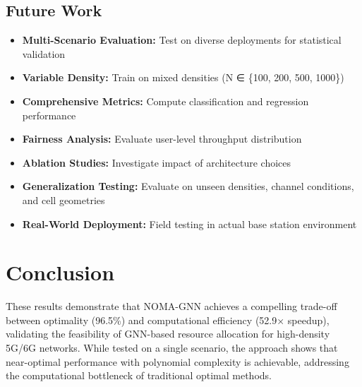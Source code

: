 \subsection{Future Work}

\begin{itemize}
    \item \textbf{Multi-Scenario Evaluation:} Test on diverse deployments for statistical validation
    
    \item \textbf{Variable Density:} Train on mixed densities (N ∈ \{100, 200, 500, 1000\})
    
    \item \textbf{Comprehensive Metrics:} Compute classification and regression performance
    
    \item \textbf{Fairness Analysis:} Evaluate user-level throughput distribution
    
    \item \textbf{Ablation Studies:} Investigate impact of architecture choices
    
    \item \textbf{Generalization Testing:} Evaluate on unseen densities, channel conditions, and cell geometries
    
    \item \textbf{Real-World Deployment:} Field testing in actual base station environment
\end{itemize}

\section{Conclusion}

These results demonstrate that NOMA-GNN achieves a compelling trade-off between optimality (96.5\%) and computational efficiency (52.9× speedup), validating the feasibility of GNN-based resource allocation for high-density 5G/6G networks. While tested on a single scenario, the approach shows that near-optimal performance with polynomial complexity is achievable, addressing the computational bottleneck of traditional optimal methods.
